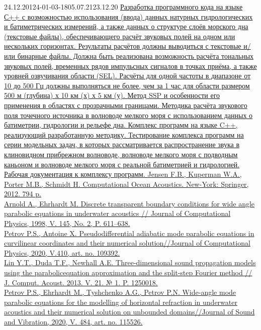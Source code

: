 \documentclass[../document.tex]{subfiles}
\begin{document}
    \begin{thesistask}{24.12.20}{124-01-03-18}{05.07.21}{23.12.20}
        \taskitem
        \uline{
            Разработка программного кода на языке С++ с возможностью использования (ввода) данных натур\-ных гидрологических и батиметрических измерений, а также данных о структуре слоёв морского дна  (текстовые файлы), обеспечивающего расчёт звуковых полей на одном или нескольких гори\-зонтах. Результаты расчётов должны выводиться с текстовые и/или бинарные файлы. Должна быть реализована возможность расчёта тональных звуковых полей, временных рядов импульсных сигналов в точках приёма, а также уровней озвучивания области (SEL). Расчёты для одной частоты в диапазоне от 10 до 500 Гц должны выполняться не более, чем за 1 час для области размером 500 м (глубина) х 10 км (х) х 5 км (у).\hfill\null
        }
        \taskitem
        \uline{
            Метод SSP и особенности его применения в областях с прозрачными границами. Методика расчёта звукового поля точечного источника в волноводе мелкого моря с использованием данных о бати\-метрии, гидрологии и рельефе дна. Комплекс программ на языке C++, реализующий разработан\-ную методику. Тестирование комплекса программ на серии модельных задач, в которых рассматри\-вается распространение звука в клиновидном прибрежном волноводе, волноводе мелкого моря с подводным каньоном и волноводе мелкого моря с реальной батиметрией и гидрологией. Рабочая документация к комплексу программ.\hfill\null
        }
        \taskitem
        \uline{
            Jensen F.B., Kuperman W.A., Porter M.B., Schmidt H. Computational Ocean Acoustics. New-York: Springer, 2012. 794 p.\hfill\null\\
            Arnold A., Ehrhardt M. Discrete transparent boundary conditions for wide angle parabolic equations in underwater acoustics // Journal of Computational Physics, 1998, V. 145, No. 2, P. 611--638.\hfill\null\\
            Petrov P.S., Antoine X. Pseudodifferential adiabatic mode parabolic equations in curvilinear coordinates and their numerical solution//Journal of Computational Physics, 2020, V.410, art. no. 109392.\hfill\null\\
            Lin Y.T., Duda T.F., Newhall A.E. Three-dimensional sound propagation models using the parabolic\-equation approximation and the split-step Fourier method // J. Comput. Acoust. 2013. V. 21. № 1. P. 1250018.\hfill\null\\
            Petrov P.S., Ehrhardt M., Tyshchenko A.G., Petrov P.N. Wide-angle mode parabolic equations for the modelling of horizontal refraction in underwater acoustics and their numerical solution on unbounded domains//Journal of Sound and Vibration, 2020, V. 484, art. no. 115526.\hfill\null
        }
    \end{thesistask}
\end{document}
